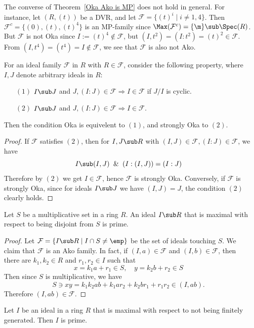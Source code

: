 \begin{remark}
The converse of Theorem~\ref{Oka Ako is MP} does not hold in general. For instance, let $(R,(t))$ be a DVR, and let $\mathcal{F}=\{(t)^i\mid i\neq 1,4\}$. Then $\mathcal{F}^c=\{(0),(t),(t)^4\}$ is an MP-family since $\Max(\mathcal{F}^c)=\{\m\}\sub\Spec(R)$. But $\mathcal{F}$ is not Oka since $I:=(t)^4\notin\mathcal{F}$, but $(I,t^2)=(I:t^2)=(t)^2\in\mathcal{F}$. From $(I,t^4)=(t^4)=I\notin\mathcal{F}$, we see that $\mathcal{F}$ is also not Ako.
\end{remark}
\begin{proposition}\label{Oka Ako condition}
For an ideal family $\mathcal{F}$ in $R$ with $R\in\mathcal{F}$, consider the following property, where $I,J$ denote arbitrary ideals in $R$:
\begin{itemize}
\item[$(1)$] $I\sub J$ and $J,(I:J)\in\mathcal{F}\Rightarrow I\in\mathcal{F}$ if $J/I$ is cyclic.
\item[$(2)$] $I\sub J$ and $J,(I:J)\in\mathcal{F}\Rightarrow I\in\mathcal{F}$.
\end{itemize}
Then the condition Oka is equivelent to $(1)$, and strongly Oka to $(2)$.
\end{proposition}
\begin{proof}
If $\mathcal{F}$ satisfies $(2)$, then for $I,J\sub R$ with $(I,J)\in\mathcal{F},(I:J)\in\mathcal{F}$, we have
\[I\sub(I,J)\And (I:(I,J))=(I:J)\]
Therefore by $(2)$ we get $I\in\mathcal{F}$, hence $\mathcal{F}$ is strongly Oka. Conversely, if $\mathcal{F}$ is strongly Oka, since for ideals $I\sub J$ we have $(I,J)=J$, the condition $(2)$ clearly holds.
\end{proof}
\begin{theorem}\label{multiplicative prime}
Let $S$ be a multiplicative set in a ring $R$. An ideal $I\sub R$ that is maximal with respect to being disjoint from $S$ is prime.
\end{theorem}
\begin{proof}
Let $\mathcal{F}=\{I\sub R\mid I\cap S\neq\emp\}$ be the set of ideals touching $S$. We claim that $\mathcal{F}$ is an Ako family. In fact, if $(I,a)\in\mathcal{F}$ and $(I,b)\in\mathcal{F}$, then there are $k_1,k_2\in R$ and $r_1,r_2\in I$ such that
\[x=k_1a+r_1\in S,\quad y=k_2b+r_2\in S\]
Then since $S$ is multiplicative, we have
\[S\ni xy=k_1k_2ab+k_1ar_2+k_2br_1+r_1r_2\in(I,ab).\]
Therefore $(I,ab)\in\mathcal{F}$.
\end{proof}
\begin{theorem}
Let $I$ be an ideal in a ring $R$ that is maximal with respect to not being finitely generated. Then $I$ is prime.
\end{theorem}
